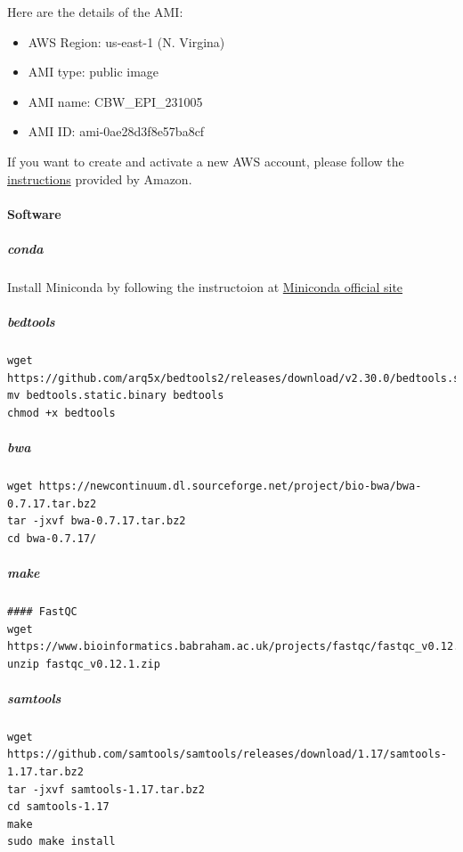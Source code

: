 \documentclass[
]{book}
\providecommand{\tightlist}{%
  \setlength{\itemsep}{0pt}\setlength{\parskip}{0pt}}
\begin{document}
Here are the details of the AMI:

\begin{itemize}
\tightlist
\item
  AWS Region: us-east-1 (N. Virgina)
\item
  AMI type: public image
\item
  AMI name: CBW\_EPI\_231005
\item
  AMI ID: ami-0ae28d3f8e57ba8cf
\end{itemize}

If you want to create and activate a new AWS account, please follow the \href{https://aws.amazon.com/premiumsupport/knowledge-center/create-and-activate-aws-account/}{instructions} provided by Amazon.

\paragraph{Software}\label{software}

\subparagraph{conda}\label{conda}

Install Miniconda by following the instructoion at \href{https://docs.conda.io/en/main/miniconda.html}{Miniconda official site}

\subparagraph{bedtools}\label{bedtools}

\begin{verbatim}
wget https://github.com/arq5x/bedtools2/releases/download/v2.30.0/bedtools.static.binary
mv bedtools.static.binary bedtools
chmod +x bedtools
\end{verbatim}

\subparagraph{bwa}\label{bwa}

\begin{verbatim}
wget https://newcontinuum.dl.sourceforge.net/project/bio-bwa/bwa-0.7.17.tar.bz2
tar -jxvf bwa-0.7.17.tar.bz2
cd bwa-0.7.17/
\end{verbatim}

\subparagraph{make}\label{make}

\begin{verbatim}
#### FastQC
wget https://www.bioinformatics.babraham.ac.uk/projects/fastqc/fastqc_v0.12.1.zip
unzip fastqc_v0.12.1.zip
\end{verbatim}

\subparagraph{samtools}\label{samtools}

\begin{verbatim}
wget https://github.com/samtools/samtools/releases/download/1.17/samtools-1.17.tar.bz2
tar -jxvf samtools-1.17.tar.bz2
cd samtools-1.17
make
sudo make install
\end{verbatim}
\end{document}
